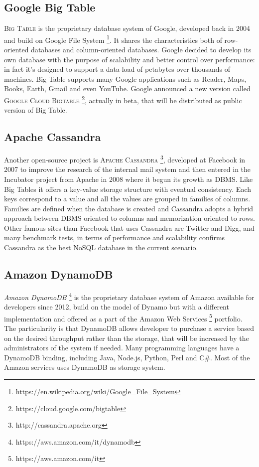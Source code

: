 \subsection{Google Big Table}
\textsc{Big Table} is the proprietary database system of Google, developed back in 2004 and build on Google File System \footnote{https://en.wikipedia.org/wiki/Google\_File\_System}. It shares the characteristics both of row-oriented databases and column-oriented databases. Google decided to develop its own database with the purpose of scalability and better control over performance: in fact it’s designed to support a data-load of petabytes over thousands of machines.
Big Table supports many Google applications such as Reader, Maps, Books, Earth, Gmail and even YouTube.
Google announced a new version called \textsc{Google Cloud Bigtable }\footnote{https://cloud.google.com/bigtable}, actually in beta, that will be distributed as public version of Big Table.

\subsection{Apache Cassandra}
Another open-source project is \textsc{Apache Cassandra} \footnote{http://cassandra.apache.org}, developed at Facebook in 2007 to improve the research of the internal mail system and then entered in the Incubator project from Apache in 2008 where it begun its growth as DBMS.
Like Big Tables it offers a key-value storage structure with eventual consistency. Each keys correspond to a value and all the values are grouped in families of columns. Families are defined when the database is created and Cassandra adopts a hybrid approach between DBMS oriented to columns and memorization oriented to rows.
Other famous sites than Facebook that uses Cassandra are Twitter and Digg, and many benchmark tests, in terms of performance and scalability confirms Cassandra as the best NoSQL database in the current scenario.

\subsection{Amazon DynamoDB}
\textit{Amazon DynamoDB} \footnote{https://aws.amazon.com/it/dynamodb} is the proprietary database system of Amazon available for developers since 2012, build on the model of Dynamo but with a different implementation and offered as a part of the Amazon Web Services \footnote{https://aws.amazon.com/it} portfolio. The particularity is that DynamoDB allows developer to purchase a service based on the desired throughput rather than the storage, that will be increased by the administrators of the system if needed.
Many programming languages have a DynamoDB binding, including Java, Node.js, Python, Perl and C\#.
Most of the Amazon services uses DynamoDB as storage system.


